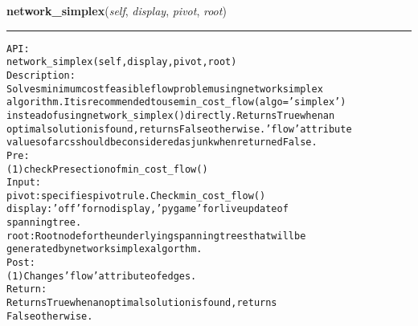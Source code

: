 \hspace{.8\funcindent}\begin{boxedminipage}{\funcwidth}

    \raggedright \textbf{network\_simplex}(\textit{self}, \textit{display}, \textit{pivot}, \textit{root})

    \vspace{-1.5ex}

    \rule{\textwidth}{0.5\fboxrule}
\setlength{\parskip}{2ex}
\begin{alltt}

API:
    network\_simplex(self, display, pivot, root)
Description:
    Solves minimum cost feasible flow problem using network simplex
    algorithm. It is recommended to use min\_cost\_flow(algo='simplex')
    instead of using network\_simplex() directly. Returns True when an
    optimal solution is found, returns False otherwise. 'flow' attribute
    values of arcs should be considered as junk when returned False.
Pre:
    (1) check Pre section of min\_cost\_flow()
Input:
    pivot: specifies pivot rule. Check min\_cost\_flow()
    display: 'off' for no display, 'pygame' for live update of
    spanning tree.
    root: Root node for the underlying spanning trees that will be
    generated by network simplex algorthm.
Post:
    (1) Changes 'flow' attribute of edges.
Return:
    Returns True when an optimal solution is found, returns
    False otherwise.
\end{alltt}

\setlength{\parskip}{1ex}
    \end{boxedminipage}

    \label{coinor:gimpy:graph:Graph:page_rank}

    \vspace{0.5ex}

